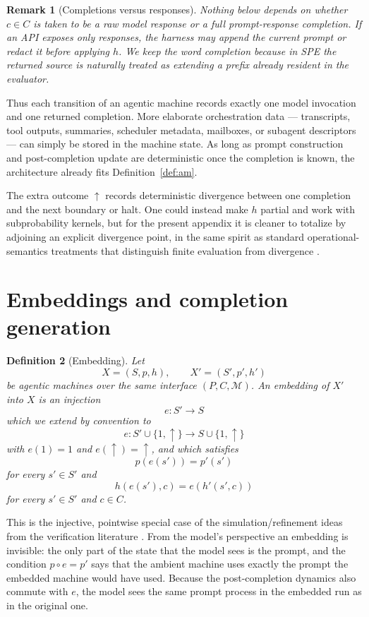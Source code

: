 \documentclass[11pt]{article}
\newtheorem{definition}{Definition}[section]
\newtheorem{remark}[definition]{Remark}
\begin{document}
\begin{remark}[Completions versus responses]
Nothing below depends on whether $c\in C$ is taken to be a raw model response or a full prompt-response completion. If an API exposes only responses, the harness may append the current prompt or redact it before applying $h$. We keep the word \emph{completion} because in SPE the returned source is naturally treated as extending a prefix already resident in the evaluator.
\end{remark}

Thus each transition of an agentic machine records exactly one model invocation and one returned completion. More elaborate orchestration data --- transcripts, tool outputs, summaries, scheduler metadata, mailboxes, or subagent descriptors --- can simply be stored in the machine state. As long as prompt construction and post-completion update are deterministic once the completion is known, the architecture already fits Definition~\ref{def:am}.

The extra outcome $\uparrow$ records deterministic divergence between one completion and the next boundary or halt. One could instead make $h$ partial and work with subprobability kernels, but for the present appendix it is cleaner to totalize by adjoining an explicit divergence point, in the same spirit as standard operational-semantics treatments that distinguish finite evaluation from divergence \cite{LeroyGrall09}.

\section{Embeddings and completion generation}

\begin{definition}[Embedding]\label{def:embedding}
Let
\[
X=(S,p,h),\qquad X'=(S',p',h')
\]
be agentic machines over the same interface $(P,C,\mathcal{M})$. An \emph{embedding} of $X'$ into $X$ is an injection
\[
e:S'\to S
\]
which we extend by convention to
\[
e:S'\cup\{1,\uparrow\}\to S\cup\{1,\uparrow\}
\]
with $e(1)=1$ and $e(\uparrow)=\uparrow$, and which satisfies
\[
p(e(s'))=p'(s')
\]
for every $s'\in S'$ and
\[
h(e(s'),c)=e(h'(s',c))
\]
for every $s'\in S'$ and $c\in C$.
\end{definition}

This is the injective, pointwise special case of the simulation/refinement ideas from the verification literature \cite{AbadiLamport91,LynchVaandrager95,SegalaLynch95}. From the model's perspective an embedding is invisible: the only part of the state that the model sees is the prompt, and the condition $p\circ e=p'$ says that the ambient machine uses exactly the prompt the embedded machine would have used. Because the post-completion dynamics also commute with $e$, the model sees the same prompt process in the embedded run as in the original one.
\end{document}
